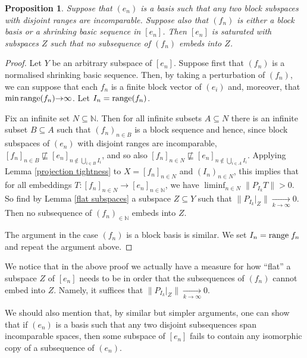 \documentclass[10pt]{amsart}
\numberwithin{equation}{section}
\newtheorem{prop} [thm] {Proposition}
\begin{document}
\begin{prop}\label{opposite}
Suppose that $(e_n)$ is a basis such that any two block subspaces with disjoint
ranges are incomparable. Suppose also that $(f_n)$ is either a block basis or a
shrinking basic sequence in $[e_n]$. Then $[e_n]$ is saturated with subspaces
$Z$ such that no subsequence of $(f_n)$ embeds into $Z$.
\end{prop}

\begin{proof}Let $Y$ be an arbitrary subspace of $[e_n]$.
Suppose first that $(f_n)$ is a normalised shrinking basic sequence. Then, by
taking a perturbation of $(f_n)$, we can suppose that each $f_n$ is a finite
block vector of $(e_i)$ and, moreover, that $\min{\rm range}(f_n){\rightarrow} \infty$.
Let $I_n={\rm range}(f_n)$.

Fix an infinite set $N\subseteq {\mathbb N}$. Then for all infinite subsets $A\subseteq
N$ there is an infinite subset $B\subseteq A$ such that $(f_n)_{n\in B}$ is a
block sequence and hence, since  block subspaces of $(e_n)$ with disjoint
ranges are incomparable,  $[f_n]_{n\in B}\not\sqsubseteq [e_n]_{n\notin
\bigcup_{i\in B}I_i}$, and so also $[f_n]_{n\in N}\not\sqsubseteq
[e_n]_{n\notin \bigcup_{i\in A}I_i}$. Applying Lemma \ref{projection tightness}
to $X=[f_n]_{n\in N}$ and $(I_n)_{n\in N}$, this implies that for all
embeddings $T\colon [f_n]_{n\in N}{\rightarrow} [e_n]_{n\in {\mathbb N}}$, we have $\liminf_{n\in
N}{\lVert{P_{I_k}T}\rVert}>0$. So find by Lemma \ref{flat subspaces} a subspace
$Z\subseteq Y$ such that ${\lVert{P_{I_k}|_ Z}\rVert}{\mathop{\longrightarrow}\limits_{{k{\rightarrow} \infty}}}0$. Then no
subsequence of $(f_n)_{\in {\mathbb N}}$ embeds into $Z$.

The argument in the case $(f_n)$ is a block basis is similar.
We set $I_n={\rm range}\;f_n$ and repeat the argument above.
\end{proof}

We notice that in the above proof we actually have a measure for how ``flat'' a
subspace $Z$ of  $[e_n]$ needs to be in order that the subsequences of $(f_n)$
cannot embed into $Z$. Namely, it suffices that ${\lVert{P_{I_k}|_ Z}\rVert}{\mathop{\longrightarrow}\limits_{{k{\rightarrow}
\infty}}}0$.

We should also mention that, by similar but simpler arguments, one can show
that if $(e_n)$ is a basis such that any two disjoint subsequences span
incomparable spaces, then some subspace of $[e_n]$ fails to contain any
isomorphic copy of a subsequence of $(e_n)$.
\end{document}
